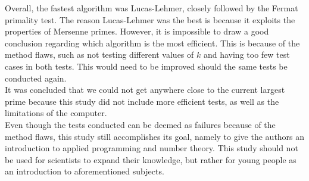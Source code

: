 \documentclass[main.tex]{subfiles}
\begin{document}
Overall, the fastest algorithm was Lucas-Lehmer, closely followed by the Fermat
primality test. The reason Lucas-Lehmer was the best is because it exploits the
properties of Mersenne primes. However, it is impossible to draw a good
conclusion regarding which algorithm is the most efficient. This is because of
the method flaws, such as not testing different values of $k$ and having too few
test cases in both tests. This would need to be improved
should the same tests be conducted again. \\

It was concluded that we could not get anywhere close to the current largest
prime because this study did not include more efficient tests, as well as the
limitations of the computer. \\

Even though the tests conducted can be deemed as failures because of the method
flaws, this study still accomplishes its goal, namely to give the authors an
introduction to applied programming and number theory. This study should not be
used for scientists to expand their knowledge, but rather for young people as an
introduction to aforementioned subjects.
\end{document}
